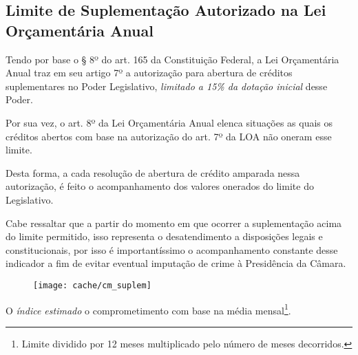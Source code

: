 
\subsection[Limite de Suplementação]{Limite de Suplementação Autorizado na Lei Orçamentária Anual}

Tendo por base o § 8º do art. 165 da Constituição Federal, a Lei Orçamentária Anual traz em seu artigo 7º a autorização para abertura de créditos suplementares no Poder Legislativo, \textit{limitado a 15\% da dotação inicial} desse Poder.

Por sua vez, o art. 8º da Lei Orçamentária Anual elenca situações as quais os créditos abertos com base na autorização do art. 7º da LOA não oneram esse limite.

Desta forma, a cada resolução de abertura de crédito amparada nessa autorização, é feito o acompanhamento dos valores onerados do limite do Legislativo.



Cabe ressaltar que a partir do momento em que ocorrer a suplementação acima do limite permitido, isso representa o desatendimento a disposições legais e constitucionais, por isso é importantíssimo o acompanhamento constante desse indicador a fim de evitar eventual imputação de crime à Presidência da Câmara.

\begin{figure}
\center
\texttt{[image: cache/cm\_suplem]}
\end{figure}

O \textit{índice estimado} o comprometimento com base na média mensal\footnote{Limite dividido por 12 meses multiplicado pelo número de meses decorridos.}.